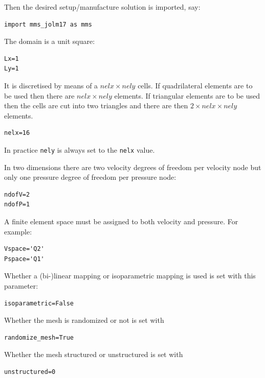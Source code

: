 Then the desired setup/manufacture solution is imported, say:
\begin{lstlisting}
import mms_jolm17 as mms
\end{lstlisting}


The domain is a unit square:
\begin{lstlisting}
Lx=1
Ly=1
\end{lstlisting}

It is discretised by means of a $nelx\times nely$ cells. If quadrilateral 
elements are to be used then there are $nelx\times nely$ elements. If 
triangular elements are to be used then the cells are cut into two 
triangles and there are then $2\times nelx\times nely$ elements.

\begin{lstlisting}
nelx=16
\end{lstlisting}
In practice \lstinline{nely} is always set to the \lstinline{nelx} value.



In two dimensions there are two velocity degrees of freedom per 
velocity node but only one pressure degree of freedom per pressure node:
\begin{lstlisting}
ndofV=2
ndofP=1
\end{lstlisting}

A finite element space must be assigned to both velocity and pressure. For example: 
\begin{lstlisting}
Vspace='Q2'
Pspace='Q1'
\end{lstlisting}

Whether a (bi-)linear mapping or isoparametric mapping is used is set with 
this parameter:
\begin{lstlisting}
isoparametric=False
\end{lstlisting}

Whether the mesh is randomized or not is set with 
\begin{lstlisting}
randomize_mesh=True
\end{lstlisting}

Whether the mesh structured or unstructured is set with 
\begin{lstlisting}
unstructured=0
\end{lstlisting}


